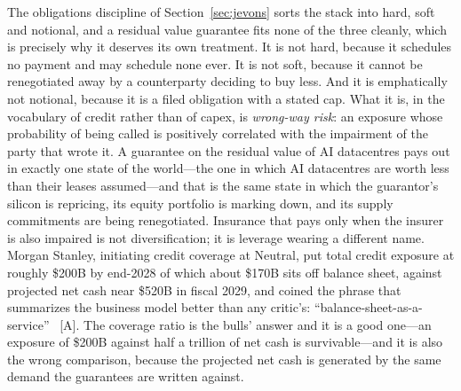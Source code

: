 The obligations discipline of Section~\ref{sec:jevons} sorts the stack into hard, soft and notional, and a residual value guarantee fits none of the three cleanly, which is precisely why it deserves its own treatment. It is not hard, because it schedules no payment and may schedule none ever. It is not soft, because it cannot be renegotiated away by a counterparty deciding to buy less. And it is emphatically not notional, because it is a filed obligation with a stated cap. What it is, in the vocabulary of credit rather than of capex, is \emph{wrong-way risk}: an exposure whose probability of being called is positively correlated with the impairment of the party that wrote it. A guarantee on the residual value of AI datacentres pays out in exactly one state of the world---the one in which AI datacentres are worth less than their leases assumed---and that is the same state in which the guarantor's silicon is repricing, its equity portfolio is marking down, and its supply commitments are being renegotiated. Insurance that pays only when the insurer is also impaired is not diversification; it is leverage wearing a different name. Morgan Stanley, initiating credit coverage at Neutral, put total credit exposure at roughly \$200B by end-2028 of which about \$170B sits off balance sheet, against projected net cash near \$520B in fiscal 2029, and coined the phrase that summarizes the business model better than any critic's: ``balance-sheet-as-a-service''~\cite{nvda-morgan-stanley} [A]. The coverage ratio is the bulls' answer and it is a good one---an exposure of \$200B against half a trillion of net cash is survivable---and it is also the wrong comparison, because the projected net cash is generated by the same demand the guarantees are written against.

